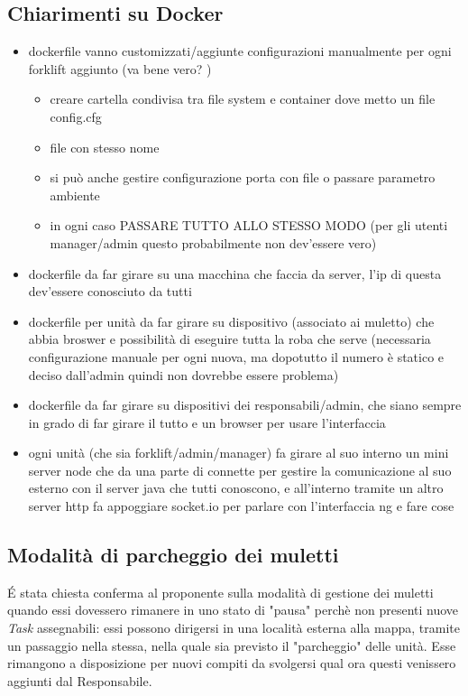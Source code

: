 \subsection{Chiarimenti su Docker}

\begin{itemize}
	\item dockerfile vanno customizzati/aggiunte configurazioni manualmente per ogni forklift aggiunto (va bene vero?   )
	\begin{itemize}
		\item creare cartella condivisa tra file system e container dove metto un file config.cfg
		\item file con stesso nome 
		\item si può anche gestire configurazione porta con file o passare parametro ambiente
		\item in ogni caso PASSARE TUTTO ALLO STESSO MODO (per gli utenti manager/admin questo probabilmente non dev’essere vero)
		
	\end{itemize}
	\item dockerfile da far girare su una macchina che faccia da server, l’ip di questa dev’essere conosciuto da tutti
	\item dockerfile per unità da far girare su dispositivo (associato ai muletto) che abbia broswer e possibilità di eseguire tutta la roba che serve (necessaria configurazione manuale per ogni nuova, ma dopotutto il numero è statico e deciso dall’admin quindi non dovrebbe essere problema)
	\item dockerfile da far girare su dispositivi dei responsabili/admin, che siano sempre in grado di far girare il tutto e un browser per usare l’interfaccia
	\item ogni unità (che sia forklift/admin/manager) fa girare al suo interno un mini server node che da una parte di connette per gestire la comunicazione al suo esterno con il server java che tutti conoscono, e all’interno tramite un altro server http fa appoggiare socket.io per parlare con l’interfaccia ng e fare cose 
\end{itemize}


\subsection{Modalità di parcheggio dei muletti}

\'E stata chiesta conferma al proponente sulla modalità di gestione dei muletti quando essi dovessero rimanere in uno stato di "pausa" perchè non presenti nuove \textit{Task} assegnabili: essi possono dirigersi in una località esterna alla mappa, tramite un passaggio nella stessa, nella quale sia previsto il "parcheggio" delle unità. Esse rimangono a disposizione per nuovi compiti da svolgersi qual ora questi venissero aggiunti dal Responsabile.

